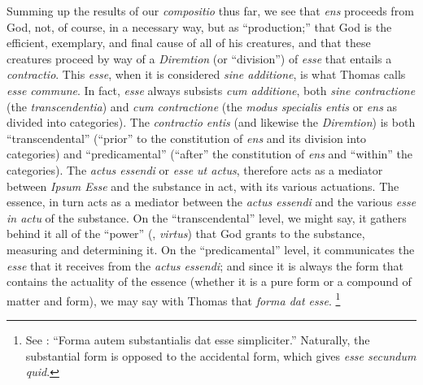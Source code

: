 Summing up the results of our \emph{compositio} thus far, we see that \emph{ens} proceeds from God, not, of course, in a necessary way, but as ``production;'' that God is the efficient, exemplary, and final cause of all of his creatures, and that these creatures proceed by way of a \emph{Diremtion} (or ``division'') of \emph{esse} that entails a \emph{contractio}. This \emph{esse}, when it is considered \emph{sine additione}, is what Thomas calls \emph{esse commune}. In fact, \emph{esse} always subsists \emph{cum additione}, both \emph{sine contractione} (the \emph{transcendentia}) and \emph{cum contractione} (the \emph{modus specialis entis} or \emph{ens} as divided into categories). The \emph{contractio entis} (and likewise the \emph{Diremtion}) is both ``transcendental'' (``prior'' to the constitution of \emph{ens} and its division into categories) and ``predicamental'' (``after'' the constitution of \emph{ens} and ``within'' the categories). The \emph{actus essendi} or \emph{esse ut actus}, therefore acts as a mediator between \emph{Ipsum Esse} and the substance in act, with its various actuations. The essence, in turn acts as a mediator between the \emph{actus essendi} and the various \emph{esse in actu} of the substance. On the ``transcendental'' level, we might say, it gathers behind it all of the ``power'' (, \emph{virtus}) that God grants to the substance, measuring and determining it. On the ``predicamental'' level, it communicates the \emph{esse} that it receives from the \emph{actus essendi}; and since it is always the form that contains the actuality of the essence (whether it is a pure form or a compound of matter and form), we may say with Thomas that \emph{forma dat esse}.%
%
\footnote{See \cite[I, q.~76, a.~4, co.]{st:summa}: ``Forma autem substantialis dat esse simpliciter.'' Naturally, the substantial form is opposed to the accidental form, which gives \emph{esse secundum quid}.}
%


